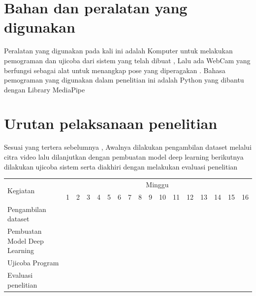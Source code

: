 \section{Bahan dan peralatan yang digunakan}

Peralatan yang digunakan pada kali ini adalah Komputer untuk melakukan pemograman dan ujicoba dari sistem yang telah dibuat , Lalu ada WebCam yang berfungsi sebagai alat untuk menangkap pose yang diperagakan . Bahasa pemograman yang digunakan dalam penelitian ini adalah Python yang dibantu dengan Library MediaPipe

\section{Urutan pelaksanaan penelitian}
Sesuai yang tertera sebelumnya , Awalnya dilakukan pengambilan dataset melalui citra video lalu dilanjutkan dengan pembuatan model deep learning berikutnya dilakukan ujicoba sistem serta diakhiri dengan melakukan evaluasi penelitian

\newcommand{\w}{}
\newcommand{\G}{\cellcolor{gray}}
\begin{table}[h!]
  \label{tbl:timeline}
  \begin{tabular}{|p{3.5cm}|c|c|c|c|c|c|c|c|c|c|c|c|c|c|c|c|}

    \hline
    \multirow{2}{*}{Kegiatan} & \multicolumn{16}{|c|}{Minggu} \\
    \cline{2-17} &
    1 & 2 & 3 & 4 & 5 & 6 & 7 & 8 & 9 & 10 & 11 & 12 & 13 & 14 & 15 & 16 \\
    \hline

    Pengambilan dataset &
    \G & \G & \G & \G & \w & \w & \w & \w & \w & \w & \w & \w & \w & \w & \w & \w \\
    \hline

    Pembuatan Model Deep Learning &
    \w & \w & \w & \w & \G & \G & \G & \G & \w & \w & \w & \w & \w & \w & \w & \w \\
    \hline

    Ujicoba Program &
    \w & \w & \w & \w & \w & \w & \w & \w & \G & \G & \G & \G & \w & \w & \w & \w \\
    \hline

    Evaluasi penelitian &
    \w & \w & \w & \w & \w & \w & \w & \w & \w & \w & \w & \w & \G & \G & \G & \G \\
    \hline

  \end{tabular}
\end{table}